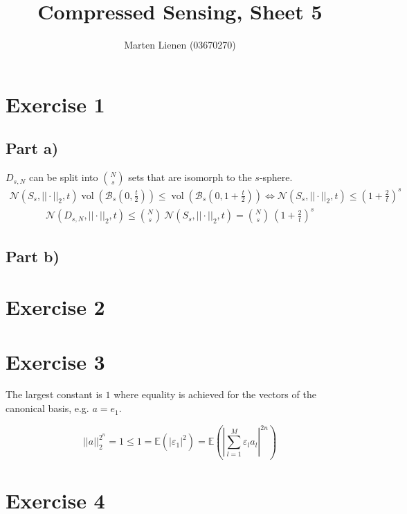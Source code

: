 \documentclass[10pt,a4paper]{article}
\title{Compressed Sensing, Sheet 5}
\author{Marten Lienen (03670270)}
\DeclareMathOperator{\vol}{vol}
\begin{document}
\maketitle

\section*{Exercise 1}

\subsection*{Part a)}

$D_{s, N}$ can be split into $\binom{N}{s}$ sets that are isomorph to the $s$-sphere.
\begin{align*}
  \mathcal{N}(S_{s}, ||\cdot||_{2}, t) \vol\left( \mathcal{B}_{s}\left( 0, \frac{t}{2} \right) \right) \le \vol\left( \mathcal{B}_{s}\left( 0, 1 + \frac{t}{2} \right) \right) \Leftrightarrow \mathcal{N}(S_{s}, ||\cdot||_{2}, t) \le \left( 1 + \frac{2}{t} \right)^{s}
\end{align*}
\begin{align*}
  \mathcal{N}(D_{s, N}, ||\cdot||_{2}, t) \le \binom{N}{s}~\mathcal{N}(S_{s}, ||\cdot||_{2}, t) = \binom{N}{s}~\left( 1 + \frac{2}{t} \right)^{s}
\end{align*}

\subsection*{Part b)}

\section*{Exercise 2}

\section*{Exercise 3}

The largest constant is $1$ where equality is achieved for the vectors of the canonical basis, e.g. $a = e_{1}$.

\begin{equation*}
  ||a||_{2}^{2^{n}} = 1 \le 1 = \mathbb{E}\left( |\varepsilon_{1}|^{2} \right) = \mathbb{E}\left( \left| \sum_{l = 1}^{M} \varepsilon_{l}a_{l} \right|^{2n} \right)
\end{equation*}

\section*{Exercise 4}
\end{document}
